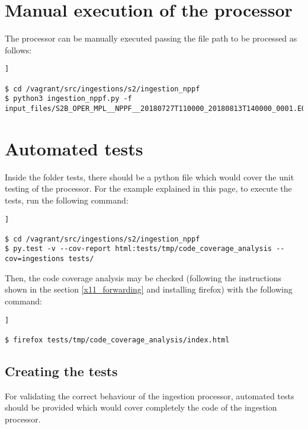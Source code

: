\section{Manual execution of the processor}

The processor can be manually executed passing the file path to be processed as follows:

\begin{lstlisting}[breaklines=true, style=bash]]

$ cd /vagrant/src/ingestions/s2/ingestion_nppf
$ python3 ingestion_nppf.py -f input_files/S2B_OPER_MPL__NPPF__20180727T110000_20180813T140000_0001.EOF

\end{lstlisting}

\section{Automated tests}

Inside the folder tests, there should be a python file which would cover the unit testing of the processor. For the example explained in this page, to execute the tests, run the following command:

\begin{lstlisting}[breaklines=true, style=bash]]

$ cd /vagrant/src/ingestions/s2/ingestion_nppf
$ py.test -v --cov-report html:tests/tmp/code_coverage_analysis --cov=ingestions tests/

\end{lstlisting}

Then, the code coverage analysis may be checked (following the instructions shown in the section \ref{x11_forwarding} and installing firefox) with the following command:

\begin{lstlisting}[breaklines=true, style=bash]]

$ firefox tests/tmp/code_coverage_analysis/index.html

\end{lstlisting}

\subsection{Creating the tests}

For validating the correct behaviour of the ingestion processor, automated tests should be provided which would cover completely the code of the ingestion processor.

